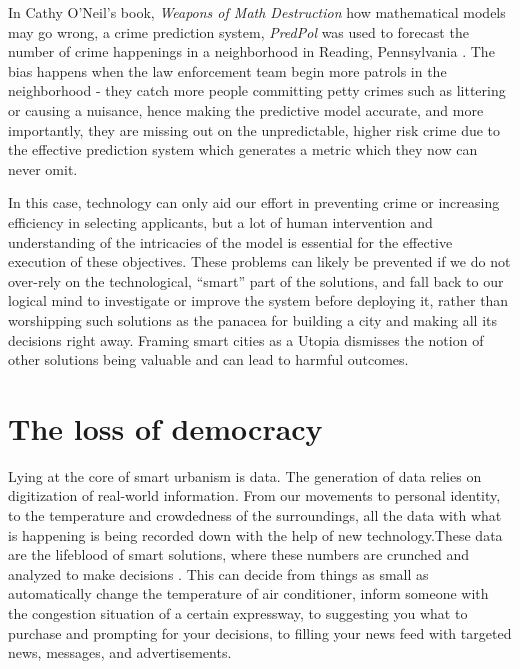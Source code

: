 \documentclass[11pt]{article}
\begin{document}
In Cathy O'Neil's book, \emph{Weapons of Math Destruction} \cite{wmd} how mathematical
models may go wrong, a crime prediction system, \emph{PredPol} was used to forecast
the number of crime happenings in a neighborhood in Reading, Pennsylvania
\cite{lum16_to_predic_serve}. The bias happens when the law enforcement team begin
more patrols in the neighborhood - they catch more people committing petty
crimes such as littering or causing a nuisance, hence making the predictive model
accurate, and more importantly, they are missing out on the unpredictable,
higher risk crime due to the effective prediction system which generates a
metric which they now can never omit. \cite{wmd}

In this case, technology can only aid our effort in preventing crime or
increasing efficiency in selecting applicants, but a lot of human intervention
and understanding of the intricacies of the model is essential for the effective
execution of these objectives. These problems can likely be prevented if we do
not over-rely on the technological, ``smart'' part of the solutions, and fall back
to our logical mind to investigate or improve the system before deploying it,
rather than worshipping such solutions as the panacea for building a city and
making all its decisions right away. Framing smart cities as a Utopia dismisses
the notion of other solutions being valuable and can lead to harmful outcomes.
\section{The loss of democracy}
\label{sec:org7e1ad13}
Lying at the core of smart urbanism is data. The generation of data relies on
digitization of real-world information. From our movements to personal identity,
to the temperature and crowdedness of the surroundings, all the data with what
is happening is being recorded down with the help of new technology.These data
are the lifeblood of smart solutions, where these numbers are crunched and
analyzed to make decisions \cite{kong18_ideol_align_smart_urban_singap}. This can
decide from things as small as automatically change the temperature of air
conditioner, inform someone with the congestion situation of a certain
expressway, to suggesting you what to purchase and prompting for your decisions,
to filling your news feed with targeted news, messages, and advertisements.
\end{document}
